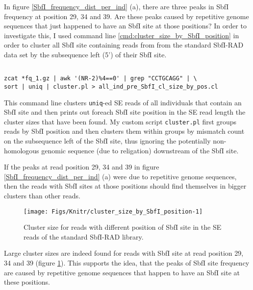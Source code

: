 \documentclass[a4paper,12pt,times,authoryear,twoside,print,index]{Classes/PhDThesisPSnPDF}\usepackage[]{graphicx}\usepackage[]{color}
\newenvironment{knitrout}{}{} %
\begin{document}
In figure \ref{SbfI_frequency_dist_per_ind} (a), there are three peaks in SbfI frequency at position 29, 34 and 39. Are these peaks caused by repetitive genome sequences that just happened to have an SbfI site at those positions? In order to investigate this, I used command line \ref{cmd:cluster_size_by_SbfI_position} in order to cluster all SbfI site containing reads from from the standard SbfI-RAD data set by the subsequence left (5') of their SbfI site.
%
\begin{cmd}
\captionsetup{type=cmd}
\begin{Verbatim}[fontsize=\scriptsize, formatcom=\color{darkgray}]

zcat *fq_1.gz | awk '(NR-2)%4==0' | grep "CCTGCAGG" | \
sort | uniq | cluster.pl > all_ind_pre_SbfI_cl_size_by_pos.cl
\end{Verbatim}
\caption{\small This command line clusters \texttt{uniq}-ed SE reads of all individuals that contain an SbfI site and then prints out foreach SbfI site position in the SE read length the cluster sizes that have been found. My custom script \texttt{cluster.pl} first groups reads by SbfI position and then clusters them within groups by mismatch count on the subsequence left of the SbfI site, thus ignoring the potentially non-homologous genomic sequence (due to religation) downstream of the SbfI site.}
\label{cmd:cluster_size_by_SbfI_position}
\end{cmd}
%
If the peaks at read position 29, 34 and 39 in figure \ref{SbfI_frequency_dist_per_ind} (a) were due to repetitive genome sequences, then the reads with SbfI sites at those positions should find themselves in bigger clusters than other reads.
%
\begin{figure}
\begin{knitrout}
\color{fgcolor}

{\centering \texttt{[image: Figs/Knitr/cluster\_size\_by\_SbfI\_position-1]} 

}



\end{knitrout}
\caption{Cluster size for reads with different position of SbfI site in the SE reads of the standard SbfI-RAD library.}
\label{cluster_size_by_SbfI_position}
\end{figure}
%
Large cluster sizes are indeed found for reads with SbfI site at read position 29, 34 and 39 (figure \ref{cluster_size_by_SbfI_position}). This supports the idea, that the peaks of SbfI site frequency are caused by repetitive genome sequences that happen to have an SbfI site at these positions.
\end{document}
